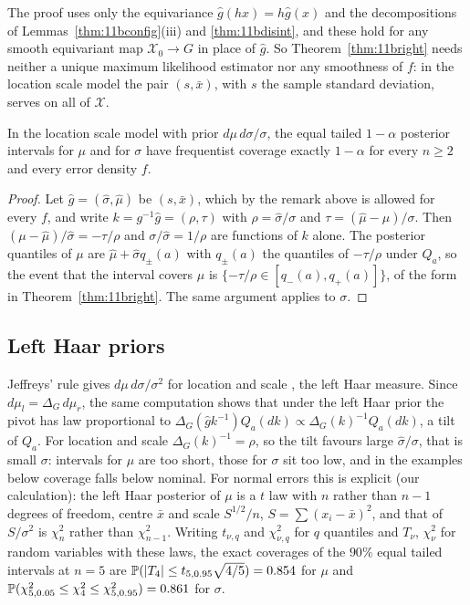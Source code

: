 The proof uses only the equivariance $\hat g(hx)=h\hat g(x)$ and the decompositions of Lemmas~\ref{thm:11bconfig}(iii) and \ref{thm:11bdisint}, and these hold for any smooth equivariant map $\mathcal X_0\to G$ in place of $\hat g$. So Theorem~\ref{thm:11bright} needs neither a unique maximum likelihood estimator nor any smoothness of $f$: in the location scale model the pair $(s,\bar x)$, with $s$ the sample standard deviation, serves on all of $\mathcal X$.

\begin{corollary}\label{thm:11bcoverage}
In the location scale model with prior $d\mu\,d\sigma/\sigma$, the equal tailed $1-\alpha$ posterior intervals for $\mu$ and for $\sigma$ have frequentist coverage exactly $1-\alpha$ for every $n\ge2$ and every error density $f$.
\end{corollary}

\begin{proof}
Let $\hat g=(\hat\sigma,\hat\mu)$ be $(s,\bar x)$, which by the remark above is allowed for every $f$, and write $k=g^{-1}\hat g=(\rho,\tau)$ with $\rho=\hat\sigma/\sigma$ and $\tau=(\hat\mu-\mu)/\sigma$. Then $(\mu-\hat\mu)/\hat\sigma=-\tau/\rho$ and $\sigma/\hat\sigma=1/\rho$ are functions of $k$ alone. The posterior quantiles of $\mu$ are $\hat\mu+\hat\sigma q_\pm(a)$ with $q_\pm(a)$ the quantiles of $-\tau/\rho$ under $Q_a$, so the event that the interval covers $\mu$ is $\{-\tau/\rho\in[q_-(a),q_+(a)]\}$, of the form in Theorem~\ref{thm:11bright}. The same argument applies to $\sigma$.
\end{proof}

\subsection{Left Haar priors}

Jeffreys' rule gives $d\mu\,d\sigma/\sigma^2$ for location and scale \cite{jeffreys1961}, the left Haar measure. Since $d\mu_l=\Delta_G\,d\mu_r$, the same computation shows that under the left Haar prior the pivot has law proportional to $\Delta_G(\hat gk^{-1})Q_a(dk)\propto\Delta_G(k)^{-1}Q_a(dk)$, a tilt of $Q_a$. For location and scale $\Delta_G(k)^{-1}=\rho$, so the tilt favours large $\hat\sigma/\sigma$, that is small $\sigma$: intervals for $\mu$ are too short, those for $\sigma$ sit too low, and in the examples below coverage falls below nominal. For normal errors this is explicit (our calculation): the left Haar posterior of $\mu$ is a $t$ law with $n$ rather than $n-1$ degrees of freedom, centre $\bar x$ and scale $S^{1/2}/n$, $S=\sum(x_i-\bar x)^2$, and that of $S/\sigma^2$ is $\chi^2_n$ rather than $\chi^2_{n-1}$. Writing $t_{\nu,q}$ and $\chi^2_{\nu,q}$ for $q$ quantiles and $T_\nu$, $\chi^2_\nu$ for random variables with these laws, the exact coverages of the $90\%$ equal tailed intervals at $n=5$ are $\mathbb{P}(|T_4|\le t_{5,0.95}\sqrt{4/5})=0.854$ for $\mu$ and $\mathbb{P}(\chi^2_{5,0.05}\le\chi^2_4\le\chi^2_{5,0.95})=0.861$ for $\sigma$.

